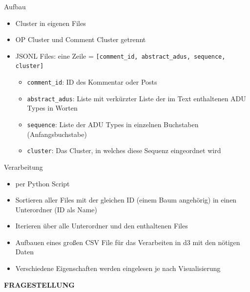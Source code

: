 \documentclass[compress,12pt]{beamer}
\begin{document}
    \begin{frame}{Aufbau}
        \begin{itemize}
            \item Cluster in eigenen Files
            \item OP Cluster und Comment Cluster getrennt
            \item JSONL Files: eine Zeile = \texttt{[comment\_id, abstract\_adus, sequence, cluster]}
            \begin{itemize}
                \item \texttt{comment\_id}: ID des Kommentar oder Posts
                \item \texttt{abstract\_adus}: Liste mit verkürzter Liste der im Text enthaltenen ADU Types in Worten
                \item \texttt{sequence}: Liste der ADU Types in einzelnen Buchstaben (Anfangsbuchstabe)
                \item \texttt{cluster}: Das Cluster, in welches diese Sequenz eingeordnet wird
            \end{itemize}
        \end{itemize}
    \end{frame}

    \begin{frame}{Verarbeitung}
        \begin{itemize}
            \item per Python Script
            \item Sortieren aller Files mit der gleichen ID (einem Baum angehörig) in einen Unterordner (ID als Name)
            \item Iterieren über alle Unterordner und den enthaltenen Files
            \item Aufbauen eines großen CSV File für das Verarbeiten in d3 mit den nötigen Daten
            \item Verschiedene Eigenschaften werden eingelesen je nach Visualisierung
        \end{itemize}
    \end{frame}

    \End


    \begin{frame}
        \centering
        \textbf{FRAGESTELLUNG}
    \end{frame}
\end{document}

